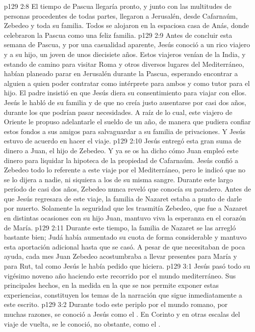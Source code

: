 \vs p129 2:8 El tiempo de Pascua llegaría pronto, y junto con las multitudes de personas procedentes de todas partes, llegaron a Jerusalén, desde Cafarnaúm, Zebedeo y toda su familia. Todos se alojaron en la espaciosa casa de Anás, donde celebraron la Pascua como una feliz familia.
\vs p129 2:9 \pc Antes de concluir esta semana de Pascua, y por una casualidad aparente, Jesús conoció a un rico viajero y a su hijo, un joven de unos diecisiete años. Estos viajeros venían de la India, y estando de camino para visitar Roma y otros diversos lugares del Mediterráneo, habían planeado parar en Jerusalén durante la Pascua, esperando encontrar a alguien a quien poder contratar como intérprete para ambos y como tutor para el hijo. El padre insistió en que Jesús diera su consentimiento para viajar con ellos. Jesús le habló de su familia y de que no creía justo ausentarse por casi dos años, durante los que podrían pasar necesidades. A raíz de lo cual, este viajero de Oriente le propuso adelantarle el sueldo de un año, de manera que pudiera confiar estos fondos a sus amigos para salvaguardar a su familia de privaciones. Y Jesús estuvo de acuerdo en hacer el viaje.
\vs p129 2:10 Jesús entregó esta gran suma de dinero a Juan, el hijo de Zebedeo. Y ya se os ha dicho cómo Juan empleó este dinero para liquidar la hipoteca de la propiedad de Cafarnaúm. Jesús confió a Zebedeo todo lo referente a este viaje por el Mediterráneo, pero le indicó que no se lo dijera a nadie, ni siquiera a los de su misma sangre. Durante este largo período de casi dos años, Zebedeo nunca reveló que conocía su paradero. Antes de que Jesús regresara de este viaje, la familia de Nazaret estaba a punto de darle por muerto. Solamente la seguridad que les trasmitía Zebedeo, que fue a Nazaret en distintas ocasiones con su hijo Juan, mantuvo viva la esperanza en el corazón de María.
\vs p129 2:11 \pc Durante este tiempo, la familia de Nazaret se las arregló bastante bien; Judá había aumentado su cuota de forma considerable y mantuvo esta aportación adicional hasta que se casó. A pesar de que necesitaban de poca ayuda, cada mes Juan Zebedeo acostumbraba a llevar presentes para María y para Rut, tal como Jesús le había pedido que hiciera.
\vs p129 3:1 Jesús pasó todo su vigésimo noveno año haciendo este recorrido por el mundo mediterráneo. Sus principales hechos, en la medida en la que se nos permite exponer estas experiencias, constituyen los temas de la narración que sigue inmediatamente a este escrito.
\vs p129 3:2 \pc Durante todo este periplo por el mundo romano, por muchas razones, se conoció a Jesús como el . En Corinto y en otras escalas del viaje de vuelta, se le conoció, no obstante, como el .
